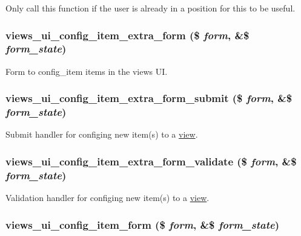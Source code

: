 Only call this function if the user is already in a position for this to be useful. \hypertarget{admin_8inc_a5b64eabdfcbc477462d3db321dccd969}{
\subsubsection[{views\_\-ui\_\-config\_\-item\_\-extra\_\-form}]{\setlength{\rightskip}{0pt plus 5cm}views\_\-ui\_\-config\_\-item\_\-extra\_\-form (\$ {\em form}, \/  \&\$ {\em form\_\-state})}}
\label{admin_8inc_a5b64eabdfcbc477462d3db321dccd969}
Form to config\_\-item items in the views UI. \hypertarget{admin_8inc_ad5e1d436875b612146deb11b52a3b98e}{
\subsubsection[{views\_\-ui\_\-config\_\-item\_\-extra\_\-form\_\-submit}]{\setlength{\rightskip}{0pt plus 5cm}views\_\-ui\_\-config\_\-item\_\-extra\_\-form\_\-submit (\$ {\em form}, \/  \&\$ {\em form\_\-state})}}
\label{admin_8inc_ad5e1d436875b612146deb11b52a3b98e}
Submit handler for configing new item(s) to a \hyperlink{classview}{view}. \hypertarget{admin_8inc_a70cfe0eb4a09c66d85dc24fd55a57b30}{
\subsubsection[{views\_\-ui\_\-config\_\-item\_\-extra\_\-form\_\-validate}]{\setlength{\rightskip}{0pt plus 5cm}views\_\-ui\_\-config\_\-item\_\-extra\_\-form\_\-validate (\$ {\em form}, \/  \&\$ {\em form\_\-state})}}
\label{admin_8inc_a70cfe0eb4a09c66d85dc24fd55a57b30}
Validation handler for configing new item(s) to a \hyperlink{classview}{view}. \hypertarget{admin_8inc_aaee6bed5581c5d6852139a0a9605bc39}{
\subsubsection[{views\_\-ui\_\-config\_\-item\_\-form}]{\setlength{\rightskip}{0pt plus 5cm}views\_\-ui\_\-config\_\-item\_\-form (\$ {\em form}, \/  \&\$ {\em form\_\-state})}}

